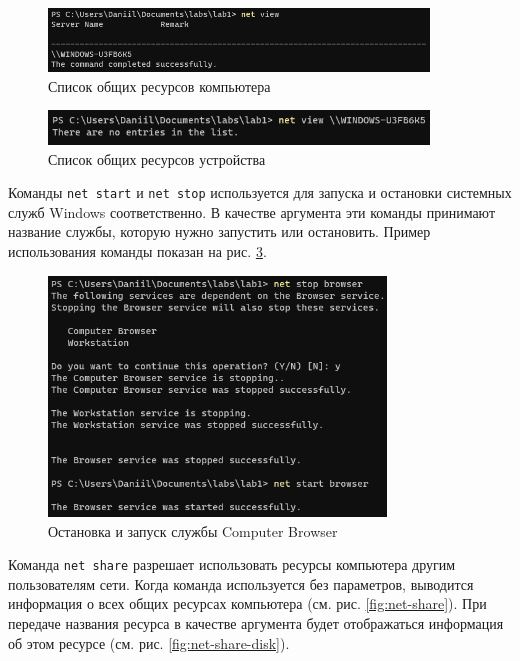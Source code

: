 \documentclass[a4paper, 14pt]{extarticle}
\begin{document}
\begin{figure}[H]
  \centering
  \includegraphics[width=0.9\textwidth]{images/net/view.png}
  \caption{Список общих ресурсов компьютера}
  \label{fig:net-view}
\end{figure}

\begin{figure}[H]
  \centering
  \includegraphics[width=0.9\textwidth]{images/net/view-computer.png}
  \caption{Список общих ресурсов устройства}
  \label{fig:net-view-computer}
\end{figure}

Команды \texttt{net start} и \texttt{net stop} используется для запуска и
остановки системных служб Windows соответственно. В качестве аргумента эти
команды принимают название службы, которую нужно запустить или остановить.
Пример использования команды показан на рис. \ref{fig:net-start-stop}.

\begin{figure}[H]
  \centering
  \includegraphics[width=0.8\textwidth]{images/net/start-stop.png}
  \caption{Остановка и запуск службы Computer Browser}
  \label{fig:net-start-stop}
\end{figure}

Команда \texttt{net share} разрешает использовать ресурсы компьютера другим
пользователям сети. Когда команда используется без параметров, выводится
информация о всех общих ресурсах компьютера (см. рис. \ref{fig:net-share}). При
передаче названия ресурса в качестве аргумента будет отображаться информация об
этом ресурсе (см. рис. \ref{fig:net-share-disk}).
\end{document}
